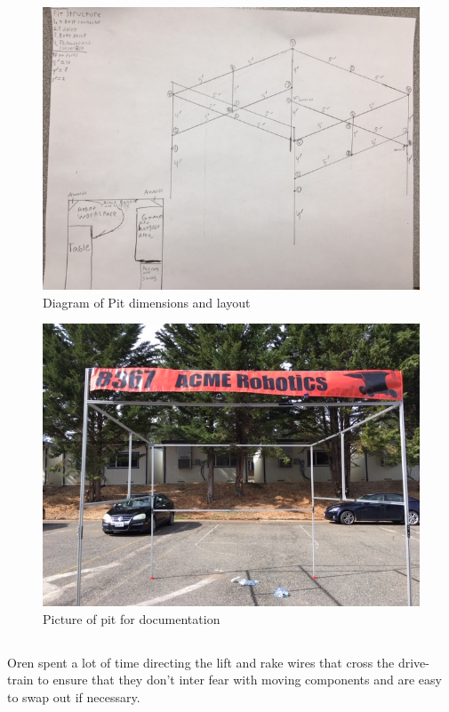 \documentclass{article}
\begin{document}
\begin{figure}
    \centering
    \includegraphics[width= 0.5 \textwidth]{30_03-25/images/pitdiagram2.JPG}
    \caption{Diagram of Pit dimensions and layout}
    \label{fig:finishedpit}
\end{figure}

\begin{figure}
    \centering
    \includegraphics[width= 0.5 \textwidth]{30_03-25/images/pitpicture.JPG}
    \caption{Picture of pit for documentation}
    \label{fig:diagram}
\end{figure}

\subsection{}
Oren spent a lot of time directing the lift and rake wires that cross the drive-train to ensure that they don't inter fear with moving components and are easy to swap out if necessary.  
\end{document}

